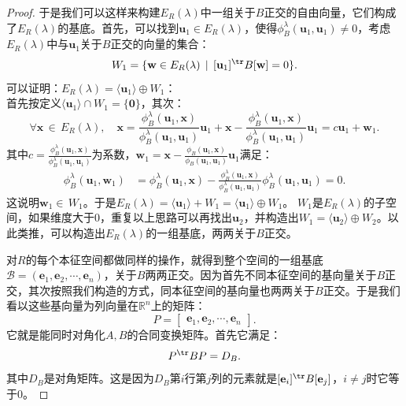\documentclass[12pt,UTF8,fontset=none]{ctexbook}
\begin{document}
\begin{appendix}
\begin{proof}
    于是我们可以这样来构建$E_R(\lambda)$中一组关于$B$正交的自由向量，它们构成了$E_R(\lambda)$的基底。首先，可以找到$\mathbf{u}_1 \in E_R(\lambda)$，使得$\phi_B^{\lambda}(\mathbf{u}_1, \mathbf{u}_1)\neq 0$，考虑$E_R(\lambda)$中与$\mathbf{u}_1$关于$B$正交的向量的集合：
    $$ W_1 = \{\mathbf{w}\in E_R(\lambda)\, \mid \, [\mathbf{u}_1]^{\tr}B[\mathbf{w}] = 0\}. $$
    可以证明：$E_R(\lambda) = \langle\mathbf{u}_1\rangle \oplus W_1$：\\
    首先按定义$\langle\mathbf{u}_1\rangle\cap W_1 = \{\mathbf{0}\}$，其次：
    $$ \forall \mathbf{x} \, \in \, E_R(\lambda), \quad \mathbf{x} = \frac{\phi_B^{\lambda}(\mathbf{u}_1,\mathbf{x})}{\phi_B^{\lambda}(\mathbf{u}_1,\mathbf{u}_1)}\mathbf{u}_1 + \mathbf{x} -\frac{\phi_B^{\lambda}(\mathbf{u}_1,\mathbf{x})}{\phi_B^{\lambda}(\mathbf{u}_1,\mathbf{u}_1)}\mathbf{u}_1 = c\mathbf{u}_1 + \mathbf{w}_1.
    $$
    其中$c = \frac{\phi_B^{\lambda}(\mathbf{u}_1,\mathbf{x})}{\phi_B^{\lambda}(\mathbf{u}_1,\mathbf{u}_1)}$为系数，$\mathbf{w}_1 = \mathbf{x} - \frac{\phi_B(\mathbf{u}_1,\mathbf{x})}{\phi_B(\mathbf{u}_1,\mathbf{u}_1)}\mathbf{u}_1$满足：
    \begin{align*}
        \phi_B^{\lambda}(\mathbf{u}_1, \mathbf{w}_1) &= \phi_B^{\lambda}(\mathbf{u}_1, \mathbf{x}) - \frac{\phi_B^{\lambda}(\mathbf{u}_1,\mathbf{x})}{\phi_B^{\lambda}(\mathbf{u}_1,\mathbf{u}_1)} \phi_B^{\lambda}(\mathbf{u}_1,\mathbf{u}_1) = 0.
    \end{align*}
    这说明$\mathbf{w}_1\in \, W_1$。于是$E_R(\lambda) = \langle\mathbf{u}_1\rangle + W_1 = \langle\mathbf{u}_1\rangle \oplus W_1$。
    $W_1$是$E_R(\lambda)$的子空间，如果维度大于$0$，重复以上思路可以再找出$\mathbf{u}_2$，并构造出$W_1 = \langle\mathbf{u}_2\rangle \oplus W_2$。以此类推，可以构造出$E_R(\lambda)$的一组基底，两两关于$B$正交。

    对$R$的每个本征空间都做同样的操作，就得到整个空间的一组基底$\mathcal{B} = (\mathbf{e}_1, \mathbf{e}_2, \cdots, \mathbf{e}_n)$，关于$B$两两正交。因为首先不同本征空间的基向量关于$B$正交，其次按照我们构造的方式，同本征空间的基向量也两两关于$B$正交。于是我们看以这些基向量为列向量在$\mathbb{R}^n$上的矩阵：
    $$ P = \begin{bmatrix}
        \mathbf{e}_1, \mathbf{e}_2, \cdots, \mathbf{e}_n
    \end{bmatrix}.$$
    它就是能同时对角化$A,B$的合同变换矩阵。首先它满足：
    $$ P^{\tr} BP = D_B.$$
    其中$D_B$是对角矩阵。这是因为$D_B$第$i$行第$j$列的元素就是$[\mathbf{e}_i]^{\tr}B[\mathbf{e}_j]$，$i\neq j$时它等于$0$。


\end{proof}
\end{appendix}
\end{document}
